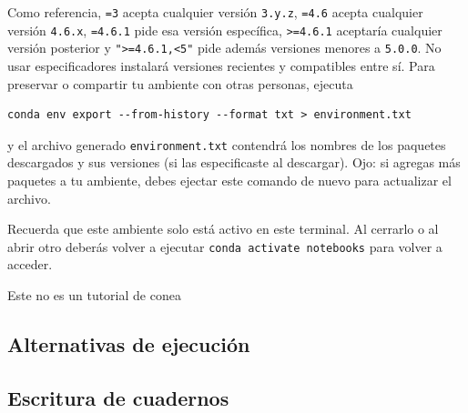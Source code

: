 \begin{enumerate}
    Como referencia, \texttt{=3} acepta cualquier versión \texttt{3.y.z},
    \texttt{=4.6} acepta cualquier versión \texttt{4.6.x},
    \texttt{=4.6.1} pide esa versión específica,
    \texttt{>=4.6.1} aceptaría cualquier versión posterior y
    \texttt{">=4.6.1,<5"} pide además versiones menores a \texttt{5.0.0}.
    No usar especificadores instalará versiones recientes y compatibles entre sí.
    Para preservar o compartir tu ambiente con otras personas, ejecuta
    \begin{verbatim}
conda env export --from-history --format txt > environment.txt
    \end{verbatim}
    y el archivo generado \texttt{environment.txt} contendrá los nombres
    de los paquetes descargados y sus versiones (si las especificaste al descargar).
    Ojo: si agregas más paquetes a tu ambiente, debes ejectar este comando de nuevo para
    actualizar el archivo.

    Recuerda que este ambiente solo está activo en este terminal. Al cerrarlo o al
    abrir otro deberás volver a ejecutar \texttt{conda activate notebooks}
    para volver a acceder.

    Este no es un tutorial de conea

\end{enumerate}

\subsection{Alternativas de ejecución}

\subsection{Escritura de cuadernos}
